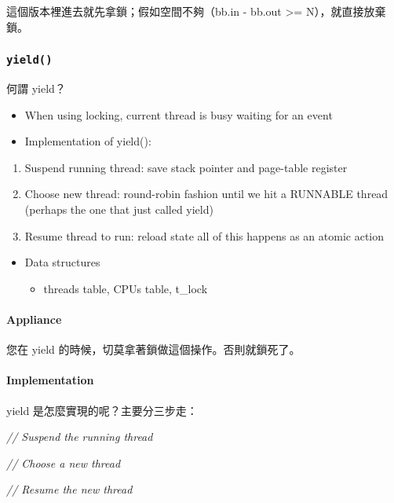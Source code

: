 \documentclass[
]{article}
\newenvironment{Shaded}{}{}
\newcommand{\CommentTok}[1]{\textcolor[rgb]{0.38,0.63,0.69}{\textit{#1}}}
\begin{document}
這個版本裡進去就先拿鎖；假如空間不夠（bb.in - bb.out \textgreater=
N），就直接放棄鎖。

\hypertarget{header-n182}{%
\subsubsection{\texorpdfstring{\texttt{yield()}}{yield()}}\label{header-n182}}

何謂 yield？

\begin{itemize}
\item
  When using locking, current thread is busy waiting for an event
\item
  Implementation of yield():
\end{itemize}

\begin{enumerate}
\def\labelenumi{\arabic{enumi}.}
\item
  Suspend running thread: save stack pointer and page-table register
\item
  Choose new thread: round-robin fashion until we hit a RUNNABLE thread
  (perhaps the one that just called yield)
\item
  Resume thread to run: reload state all of this happens as an atomic
  action
\end{enumerate}

\begin{itemize}
\item
  Data structures

  \begin{itemize}
  \item
    threads table, CPUs table, t\_lock
  \end{itemize}
\end{itemize}

\hypertarget{header-n202}{%
\paragraph{Appliance}\label{header-n202}}

您在 yield 的時候，切莫拿著鎖做這個操作。否則就鎖死了。

\hypertarget{header-n204}{%
\paragraph{Implementation}\label{header-n204}}

yield 是怎麼實現的呢？主要分三步走：

\begin{Shaded}
\begin{Highlighting}[]
\CommentTok{// Suspend the running thread}

\CommentTok{// Choose a new thread}

\CommentTok{// Resume the new thread}
\end{Highlighting}
\end{Shaded}
\end{document}
